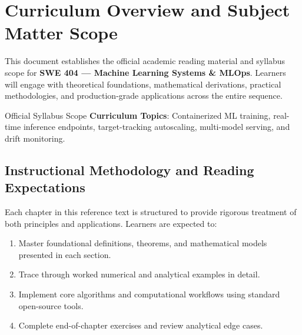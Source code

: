 \section{Curriculum Overview and Subject Matter Scope}

This document establishes the official academic reading material and syllabus scope for \textbf{SWE 404 --- Machine Learning Systems \& MLOps}. Learners will engage with theoretical foundations, mathematical derivations, practical methodologies, and production-grade applications across the entire sequence.

\begin{InsightBox}{Official Syllabus Scope}
  \textbf{Curriculum Topics}: Containerized ML training, real-time inference endpoints, target-tracking autoscaling, multi-model serving, and drift monitoring.
\end{InsightBox}

\subsection{Instructional Methodology and Reading Expectations}

Each chapter in this reference text is structured to provide rigorous treatment of both principles and applications. Learners are expected to:
\begin{enumerate}
  \item Master foundational definitions, theorems, and mathematical models presented in each section.
  \item Trace through worked numerical and analytical examples in detail.
  \item Implement core algorithms and computational workflows using standard open-source tools.
  \item Complete end-of-chapter exercises and review analytical edge cases.
\end{enumerate}

